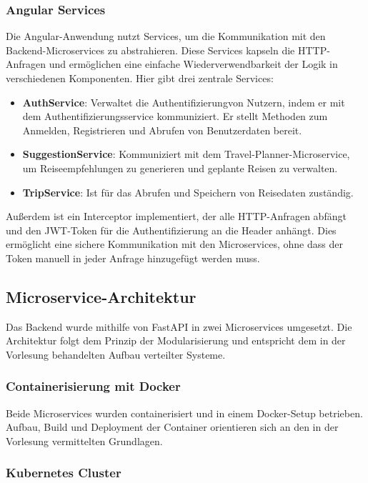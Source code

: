 \subsubsection{Angular Services}

Die Angular-Anwendung nutzt Services, um die Kommunikation mit den Backend-Microservices zu abstrahieren. Diese Services kapseln die HTTP-Anfragen und ermöglichen eine einfache Wiederverwendbarkeit der Logik in verschiedenen Komponenten.
Hier gibt drei zentrale Services:

\begin{itemize}
  \item \textbf{AuthService}: Verwaltet die Authentifizierungvon Nutzern, indem er mit dem Authentifizierungsservice kommuniziert. Er stellt Methoden zum Anmelden, Registrieren und Abrufen von Benutzerdaten bereit.
  \item \textbf{SuggestionService}: Kommuniziert mit dem Travel-Planner-Microservice, um Reiseempfehlungen zu generieren und geplante Reisen zu verwalten.
  \item \textbf{TripService}: Ist für das Abrufen und Speichern von Reisedaten zuständig.
\end{itemize}

Außerdem ist ein Interceptor implementiert, der alle HTTP-Anfragen abfängt und den JWT-Token für die Authentifizierung an die Header anhängt. Dies ermöglicht eine sichere Kommunikation mit den Microservices, ohne dass der Token manuell in jeder Anfrage hinzugefügt werden muss.


\subsection{Microservice-Architektur}

Das Backend wurde mithilfe von FastAPI in zwei Microservices umgesetzt. Die Architektur folgt dem Prinzip der Modularisierung und entspricht dem in der Vorlesung behandelten Aufbau verteilter Systeme.

\subsubsection{Containerisierung mit Docker}

Beide Microservices wurden containerisiert und in einem Docker-Setup betrieben. Aufbau, Build und Deployment der Container orientieren sich an den in der Vorlesung vermittelten Grundlagen.

\subsubsection{Kubernetes Cluster}

